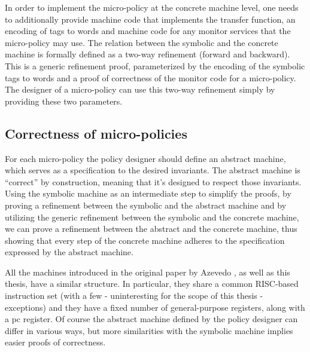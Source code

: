 
In order to implement the micro-policy at the concrete machine level, one needs
to additionally provide machine code that implements the transfer function, an
encoding of tags to words and machine code for any monitor services that the
micro-policy may use. The relation between the symbolic and the concrete machine
is formally defined as a two-way refinement (forward and backward). This is a
generic refinement proof, parameterized by the encoding of the symbolic tags to
words and a proof of correctness of the monitor code for a micro-policy.
The designer of a micro-policy can use this two-way refinement simply by
providing these two parameters.

\subsection{Correctness of micro-policies}\label{sec:verification}

For each micro-policy the policy designer should define an abstract
machine, which serves as a specification to the desired invariants.
The abstract machine is ``correct'' by construction, meaning that it's
designed to respect those invariants. Using the symbolic machine as an
intermediate step to simplify the proofs, by proving a refinement
between the symbolic and the abstract machine and by utilizing the
generic refinement between the symbolic and the concrete machine, we
can prove a refinement between the abstract and the concrete machine,
thus showing that every step of the concrete machine adheres to the
specification expressed by the abstract machine.

All the machines introduced in the original paper by Azevedo \ETAL
\cite{popl2015}, as well as this thesis, have a similar
structure. In particular, they share a common RISC-based instruction
set (with a few - uninteresting for the scope of this thesis -
exceptions) and they have a fixed number of general-purpose registers,
along with a pc register. Of course the abstract machine defined by
the policy designer can differ in various ways, but more similarities
with the symbolic machine implies easier proofs of correctness.



